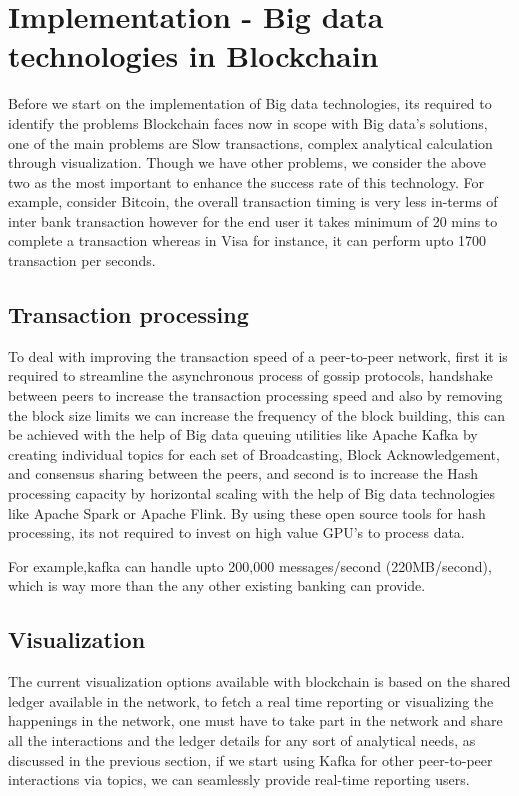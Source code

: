 \documentclass[sigconf]{acmart}
\begin{document}
\section{Implementation - Big data technologies in Blockchain}
Before we start on the implementation of Big data technologies, its required to identify the problems Blockchain faces now in scope with Big data's solutions, one of the main problems are Slow transactions, complex analytical calculation through visualization. Though we have other problems, we consider the above two as the most important to enhance the success rate of this technology.
For example, consider Bitcoin, the overall transaction timing is very less in-terms of inter bank transaction however for the end user it takes minimum of 20 mins to complete a transaction whereas in Visa for instance, it can perform upto 1700 transaction per seconds.

\subsection{Transaction processing}
To deal with improving the transaction speed of a peer-to-peer network, first it is required to streamline the asynchronous process of gossip protocols, handshake between peers to increase the transaction processing speed and also by removing the block size limits\cite{Optimize} we can increase the frequency of the block building, this can be achieved with the help of Big data queuing utilities like Apache Kafka by creating individual topics for each set of Broadcasting, Block Acknowledgement, and consensus sharing between the peers,   and second is to increase the Hash processing capacity by horizontal scaling with the help of Big data technologies like Apache Spark or Apache Flink. By using these open source tools for hash processing, its not required to invest on high value GPU's to process data.

For example,kafka can handle upto 200,000 messages/second (220MB/second)\cite{kafka_performance}, which is way more than the any other existing banking can provide.



\subsection{Visualization}
The current visualization options available with blockchain is based on the shared ledger available in the network, to fetch a real time reporting or visualizing the happenings in the network, one must have to take part in the network and share all the interactions and the ledger details for any sort of analytical needs, as discussed in the previous section, if we start using Kafka for other peer-to-peer interactions via topics, we can seamlessly provide real-time reporting users.
\end{document}
